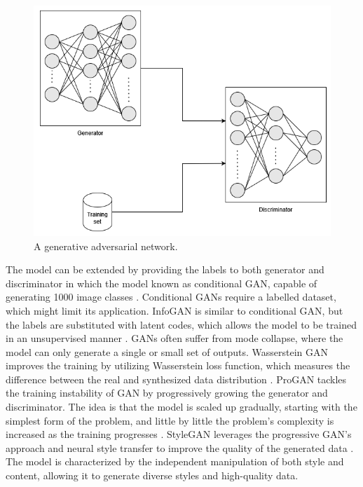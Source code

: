 \documentclass[preprint,12pt]{elsarticle}
\begin{document}
\begin{figure}[h!]
    \centering
    \includegraphics[scale=0.6]{fig_deep_unsv_learning_gan.png}
    \caption{A generative adversarial network.}
    \label{fig_deep_unsv_learning_gan}
\end{figure}

The model can be extended by providing the labels to both generator and discriminator in which the model known as conditional GAN, capable of generating 1000 image classes \citep{odena_conditional_2017}. Conditional GANs require a labelled dataset, which might limit its application. InfoGAN is similar to conditional GAN, but the labels are substituted with latent codes, which allows the model to be trained in an unsupervised manner \citep{chen_infogan_2016}. GANs often suffer from mode collapse, where the model can only generate a single or small set of outputs. Wasserstein GAN improves the training by utilizing Wasserstein loss function, which measures the difference between the real and synthesized data distribution \citep{weng_gan_2019}. ProGAN tackles the training instability of GAN by progressively growing the generator and discriminator. The idea is that the model is scaled up gradually, starting with the simplest form of the problem, and little by little the problem’s complexity is increased as the training progresses \citep{karras_progressive_2018}. StyleGAN leverages the progressive GAN’s approach and neural style transfer to improve the quality of the generated data \citep{karras_style-based_2019}. The model is characterized by the independent manipulation of both style and content, allowing it to generate diverse styles and high-quality data.
\end{document}
